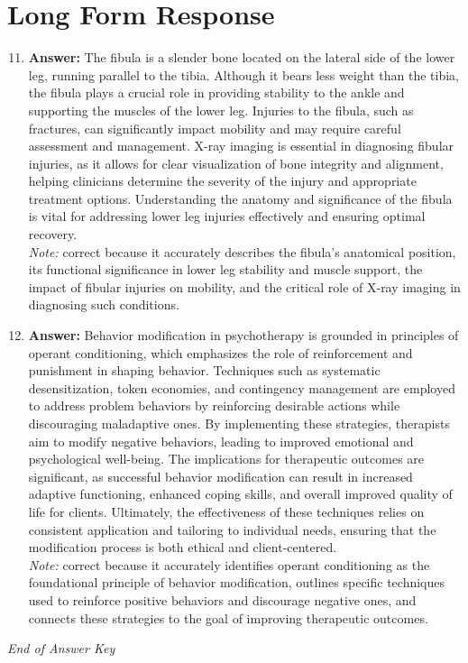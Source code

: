 \documentclass[12pt]{article}
\begin{document}
\section*{Long Form Response}
\begin{enumerate}[label=\arabic*.]
\setcounter{enumi}{10}
\item \textbf{Answer:} The fibula is a slender bone located on the lateral side of the lower leg, running parallel to the tibia. Although it bears less weight than the tibia, the fibula plays a crucial role in providing stability to the ankle and supporting the muscles of the lower leg. Injuries to the fibula, such as fractures, can significantly impact mobility and may require careful assessment and management. X-ray imaging is essential in diagnosing fibular injuries, as it allows for clear visualization of bone integrity and alignment, helping clinicians determine the severity of the injury and appropriate treatment options. Understanding the anatomy and significance of the fibula is vital for addressing lower leg injuries effectively and ensuring optimal recovery.
\\ \textit{Note:} correct because it accurately describes the fibula's anatomical position, its functional significance in lower leg stability and muscle support, the impact of fibular injuries on mobility, and the critical role of X-ray imaging in diagnosing such conditions.
\item \textbf{Answer:} Behavior modification in psychotherapy is grounded in principles of operant conditioning, which emphasizes the role of reinforcement and punishment in shaping behavior. Techniques such as systematic desensitization, token economies, and contingency management are employed to address problem behaviors by reinforcing desirable actions while discouraging maladaptive ones. By implementing these strategies, therapists aim to modify negative behaviors, leading to improved emotional and psychological well-being. The implications for therapeutic outcomes are significant, as successful behavior modification can result in increased adaptive functioning, enhanced coping skills, and overall improved quality of life for clients. Ultimately, the effectiveness of these techniques relies on consistent application and tailoring to individual needs, ensuring that the modification process is both ethical and client-centered.
\\ \textit{Note:} correct because it accurately identifies operant conditioning as the foundational principle of behavior modification, outlines specific techniques used to reinforce positive behaviors and discourage negative ones, and connects these strategies to the goal of improving therapeutic outcomes.
\end{enumerate}

\vfill
\noindent\textit{End of Answer Key}
\end{document}
